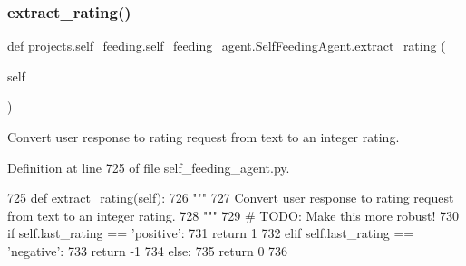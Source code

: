 \mbox{\label{classprojects_1_1self__feeding_1_1self__feeding__agent_1_1SelfFeedingAgent_a9c1c1e9435e1b56420fee71a31c5d57e}} 
\subsubsection{\texorpdfstring{extract\+\_\+rating()}{extract\_rating()}}
{\footnotesize\ttfamily def projects.\+self\+\_\+feeding.\+self\+\_\+feeding\+\_\+agent.\+Self\+Feeding\+Agent.\+extract\+\_\+rating (\begin{DoxyParamCaption}\item[{}]{self }\end{DoxyParamCaption})}

\begin{DoxyVerb}Convert user response to rating request from text to an integer rating.
\end{DoxyVerb}
 

Definition at line 725 of file self\+\_\+feeding\+\_\+agent.\+py.


\begin{DoxyCode}
725     \textcolor{keyword}{def }extract\_rating(self):
726         \textcolor{stringliteral}{"""}
727 \textcolor{stringliteral}{        Convert user response to rating request from text to an integer rating.}
728 \textcolor{stringliteral}{        """}
729         \textcolor{comment}{# TODO: Make this more robust!}
730         \textcolor{keywordflow}{if} self.last\_rating == \textcolor{stringliteral}{'positive'}:
731             \textcolor{keywordflow}{return} 1
732         \textcolor{keywordflow}{elif} self.last\_rating == \textcolor{stringliteral}{'negative'}:
733             \textcolor{keywordflow}{return} -1
734         \textcolor{keywordflow}{else}:
735             \textcolor{keywordflow}{return} 0
736 
\end{DoxyCode}
\mbox{\label{classprojects_1_1self__feeding_1_1self__feeding__agent_1_1SelfFeedingAgent_ae98cf6c1345c3cff3278339ef1c855a4}} 
